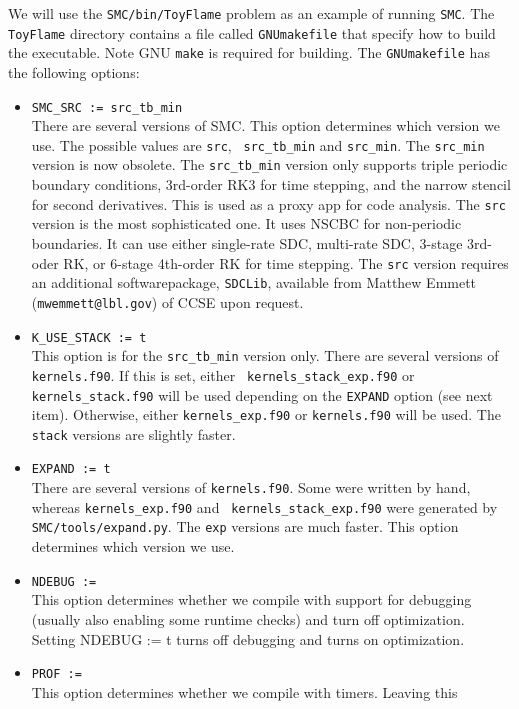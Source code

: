 \documentclass[11pt,letterpaper]{article}
\begin{document}
We will use the {\tt SMC/bin/ToyFlame} problem as an example of
running {\tt SMC}.  The {\tt ToyFlame} directory contains a file
called {\tt GNUmakefile} that specify how to build the executable.
Note GNU {\tt make} is required for building.  The {\tt GNUmakefile}
has the following options:
\begin{itemize}
\item {\tt SMC\_SRC := src\_tb\_min}\\
  There are several versions of SMC.  This option determines which
  version we use.  The possible values are {\tt src}, {\tt
    src\_tb\_min} and {\tt src\_min}.  The {\tt src\_min} version is
  now obsolete.  The {\tt src\_tb\_min} version only supports triple
  periodic boundary conditions, 3rd-order RK3 for time stepping, and
  the narrow stencil for second derivatives.  This is used as a proxy
  app for code analysis. The {\tt src} version is the most
  sophisticated one.  It uses NSCBC for non-periodic boundaries.  It
  can use either single-rate SDC, multi-rate SDC, 3-stage 3rd-oder RK,
  or 6-stage 4th-order RK for time stepping.  The {\tt src} version
  requires an additional softwarepackage, {\tt SDCLib}, available from
  Matthew Emmett ({\tt mwemmett@lbl.gov}) of CCSE upon request.
\item {\tt K\_USE\_STACK := t}\\
  This option is for the {\tt src\_tb\_min} version only. There are
  several versions of {\tt kernels.f90}.  If this is set, either {\tt
    kernels\_stack\_exp.f90} or {\tt kernels\_stack.f90} will be used
  depending on the {\tt EXPAND} option (see next item).  Otherwise,
  either {\tt kernels\_exp.f90} or {\tt kernels.f90} will be used.
  The {\tt stack} versions are slightly faster.
\item {\tt EXPAND := t}\\
  There are several versions of {\tt kernels.f90}.  Some were written
  by hand, whereas {\tt kernels\_exp.f90} and {\tt
    kernels\_stack\_exp.f90} were generated by {\tt
    SMC/tools/expand.py}.  The {\tt exp} versions are much faster.
  This option determines which version we use.
\item {\tt NDEBUG :=}\\
  This option determines whether we compile with support for debugging
  (usually also enabling some runtime checks) and turn off
  optimization. Setting NDEBUG := t turns off debugging and turns on
  optimization. 
\item {\tt PROF :=}\\
  This option determines whether we compile with timers. Leaving this

\end{itemize}
\end{document}
